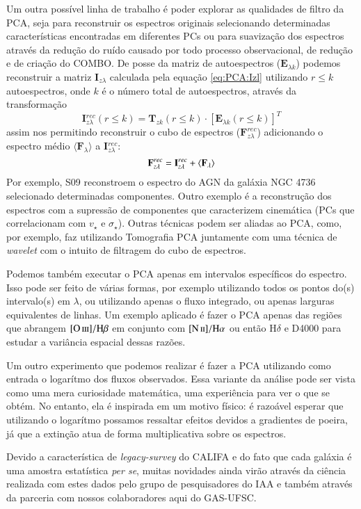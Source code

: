 Um outra possível linha de trabalho é poder explorar as qualidades de filtro da PCA, seja para reconstruir os espectros
originais selecionando determinadas características encontradas em diferentes PCs ou para suavização dos espectros
através da redução do ruído causado por todo processo observacional, de redução e de criação do COMBO. De posse da
matriz de autoespectros ($\mathbf{E}_{\lambda k}$) podemos reconstruir a matriz $\mathbf{I}_{z \lambda}$  calculada pela
equação \ref{eq:PCA:Izl} utilizando $r \leq k$ autoespectros, onde $k$ é o número total de autoespectros, através da
transformação
\begin{equation}
	\mathbf{I}{}_{z \lambda}^{rec}(r \leq k) = \mathbf{T}{}_{z k}(r \leq k) \cdot [\mathbf{E}{}_{\lambda k}(r \leq k)]^T
\end{equation}
\noindent assim nos permitindo reconstruir o cubo de espectros ($\mathbf{F}_{z \lambda}^{rec}$) adicionando o
espectro médio $\langle \mathbf{F}{}_\lambda \rangle$ a $\mathbf{I}{}_{z \lambda}^{rec}$:
\begin{equation}
	\mathbf{F}{}_{z \lambda}^{rec} = \mathbf{I}{}_{z \lambda}^{rec} + \mean{\mathbf{F}_\lambda}
\end{equation}
 \noindent Por exemplo, S09 reconstroem o espectro do AGN da galáxia NGC 4736 selecionado determinadas componentes.
 Outro exemplo é a reconstrução dos espectros com a supressão de componentes que caracterizem cinemática (PCs que
 correlacionam com $v_\star$ e $\sigma_\star$). Outras técnicas podem ser aliadas ao PCA, como, por exemplo, faz
 \citet{Riffel2011} utilizando Tomografia PCA juntamente com uma técnica de {\em wavelet} com o intuito de filtragem do
 cubo de espectros.

Podemos também executar o PCA apenas em intervalos específicos do espectro. Isso pode ser feito de várias formas, por
exemplo utilizando todos os pontos do(s) intervalo(s) em $\lambda$, ou utilizando apenas o fluxo integrado, ou apenas
larguras equivalentes de linhas. Um exemplo aplicado é fazer o PCA apenas das regiões que abrangem $\oIII/\Hbeta$ em
conjunto com $\nII/\Halpha$ ou então $\mathrm{H}\delta$ e D4000 para estudar a variância espacial dessas razões.

Um outro experimento que podemos realizar é fazer a PCA utilizando como entrada o logarítmo dos fluxos observados. Essa
variante da análise pode ser vista como uma mera curiosidade matemática, uma experiência para ver o que se obtém. No
entanto, ela é inspirada em um motivo físico: é razoável esperar que utilizando o logarítmo possamos ressaltar efeitos
devidos a gradientes de poeira, já que a extinção atua de forma multiplicativa sobre os espectros.

Devido a característica de {\em legacy-survey} do CALIFA e do fato que cada galáxia é uma amostra estatística
{\em per se}, muitas novidades ainda virão através da ciência realizada com estes dados pelo grupo de pesquisadores do
IAA e também através da parceria com nossos colaboradores aqui do GAS-UFSC.

